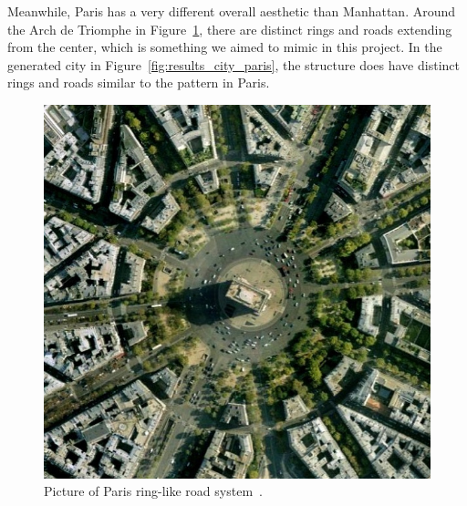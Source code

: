Meanwhile, Paris has a very different overall aesthetic than Manhattan.
Around the Arch de Triomphe in Figure~\ref{fig:results_real_city_paris}, there are distinct rings and roads extending from the center, which is something we aimed to mimic in this project.
In the generated city in Figure~\ref{fig:results_city_paris}, the structure does have distinct rings and roads similar to the pattern in Paris. 

\begin{figure}[H]
  \centering
  \begin{minipage}{.45\textwidth}
    \centering
    \begin{minipage}{.9\textwidth}
      \centering
      \includegraphics[width=\textwidth]{figure/results/paris_arc_de_triomphe.jpg}
      \caption{Picture of Paris ring-like road system~\cite{paris_city_img}.}
      \label{fig:results_real_city_paris}
    \end{minipage}
  \end{minipage}
  \begin{minipage}{.45\textwidth}
    \begin{minipage}{.9\textwidth}
      \centering
      \centering

\end{minipage}
\end{minipage}
\end{figure}
